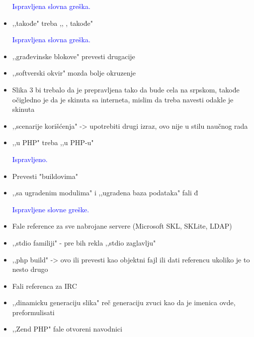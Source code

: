 \documentclass[a4paper]{report}
\newcommand{\odgovor}[1]{\textcolor{blue}{#1}}
\begin{document}
\begin{itemize}
\odgovor{Ispravljena slovna greška.}

\item ,,takođe" treba ,, , takođe"

\odgovor{Ispravljena slovna greška.}

\item ,,građevinske blokove" prevesti drugacije

\odgovor{}

\item ,,softverski okvir"  mozda bolje okruzenje

\odgovor{}

\item Slika 3 bi trebalo da je prepravljena tako da bude cela na srpskom, takođe očigledno je da je skinuta sa interneta, mislim da treba navesti odakle je skinuta

\odgovor{}

\item ,,scenarije korišćenja" -> upotrebiti drugi izraz, ovo nije u stilu naučnog rada

\odgovor{}

\item ,,u PHP" treba ,,u PHP-u"

\odgovor{Ispravljeno.}

\item Prevesti "buildovima"

\odgovor{}

\item ,,sa ugradenim modulima" i ,,ugradena baza podataka" fali đ

\odgovor{Ispravljene slovne greške.}

\item Fale reference za sve nabrojane servere (Microsoft SKL, SKLite, LDAP)

\odgovor{}

\item ,,stdio familiji" - pre bih rekla ,,stdio zaglavlju"

\odgovor{}

\item ,,php build" -> ovo ili prevesti kao objektni fajl ili dati referencu ukoliko je to nesto drugo
\item Fali referenca za IRC
\item ,,dinamicku generaciju slika" reč generaciju zvuci kao da je imenica ovde, preformulisati

\item ,,Zend PHP" fale otvoreni navodnici


\end{itemize}
\end{document}
